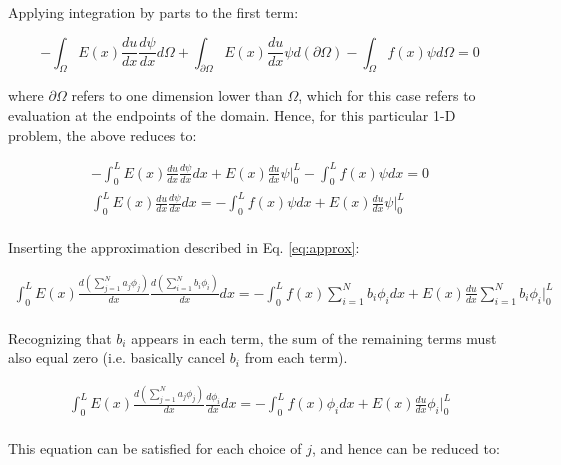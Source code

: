 \documentclass[10pt]{article}
\begin{document}
Applying integration by parts to the first term:

\begin{equation}
-\int_{\Omega}^{}E(x)\frac{du}{dx}\frac{d\psi}{dx}d\Omega+\int_{\partial\Omega}^{}E(x)\frac{du}{dx}\psi d(\partial\Omega)-\int_{\Omega}^{}f(x)\psi d\Omega=0
\end{equation}

where \(\partial\Omega\) refers to one dimension lower than \(\Omega\), which for this case refers to evaluation at the endpoints of the domain. Hence, for this particular 1-D problem, the above reduces to:

\begin{equation}
\begin{aligned}
-\int_{0}^{L}E(x)\frac{du}{dx}\frac{d\psi}{dx}dx+ E(x)\frac{du}{dx}\psi\biggr\vert_{0}^{L}-\int_{0}^{L}f(x)\psi dx=0\\
\int_{0}^{L}E(x)\frac{du}{dx}\frac{d\psi}{dx}dx=-\int_{0}^{L}f(x)\psi dx+E(x)\frac{du}{dx}\psi\biggr\vert_{0}^{L}\\
\end{aligned}
\end{equation}

Inserting the approximation described in Eq. \eqref{eq:approx}:

\begin{equation}
\begin{aligned}
\int_{0}^{L}E(x)\frac{d\left(\sum_{j=1}^{N}a_j\phi_j\right)}{dx}\frac{d\left(\sum_{i=1}^{N}b_i\phi_i\right)}{dx}dx=-\int_{0}^{L}f(x)\sum_{i=1}^{N}b_i\phi_idx+E(x)\frac{du}{dx}\sum_{i=1}^{N}b_i\phi_i\biggr\vert_{0}^{L}\\
\end{aligned}
\end{equation}

Recognizing that \(b_i\) appears in each term, the sum of the remaining terms must also equal zero (i.e. basically cancel \(b_i\) from each term).

\begin{equation}
\begin{aligned}
\int_{0}^{L}E(x)\frac{d\left(\sum_{j=1}^{N}a_j\phi_j\right)}{dx}\frac{d\phi_i}{dx}dx=-\int_{0}^{L}f(x)\phi_idx+E(x)\frac{du}{dx}\phi_i\biggr\vert_{0}^{L}\\
\end{aligned}
\end{equation}

This equation can be satisfied for each choice of \(j\), and hence can be reduced to:
\end{document}
